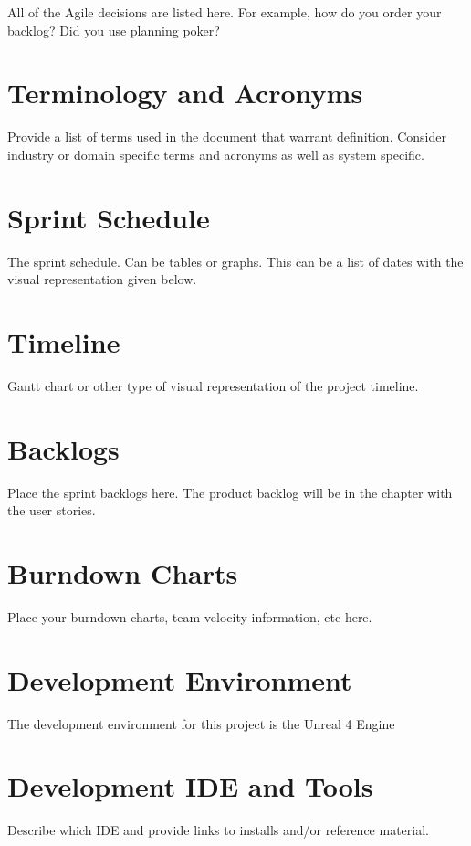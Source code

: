 All of the Agile decisions are listed here.  For example, how do you order your backlog?   
Did you use planning poker?   

\section{Terminology and Acronyms}
Provide a list of terms used in the document that warrant definition.  Consider 
industry or domain specific terms and acronyms as well as system specific. 

\section{Sprint Schedule}
The sprint schedule.  Can be tables or graphs.   This can be a list of dates with the visual 
representation given below.

\section{Timeline}
Gantt chart or other type of visual representation of the project timeline.

\section{Backlogs}
Place the sprint backlogs here.    The product backlog will be in the chapter with the user 
stories.

\section{Burndown Charts}
Place your burndown charts, team velocity information, etc here.   


\section{Development Environment}
The development environment for this project is the Unreal 4 Engine


\section{Development IDE and Tools}
Describe which IDE and provide links to installs and/or reference material. 

